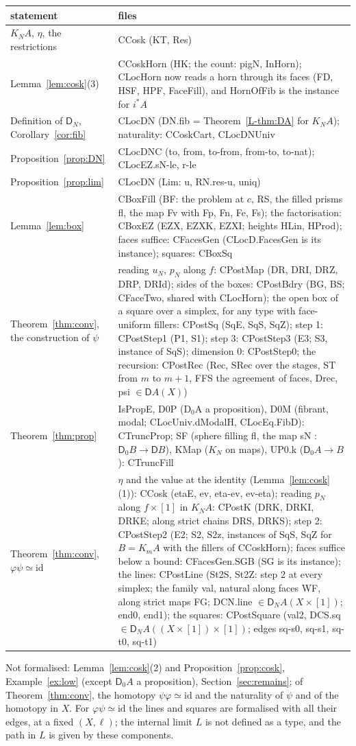 \documentclass[11pt]{article}
\newcommand{\id}{\mathrm{id}}
\newcommand{\D}{\mathsf{D}}
\theoremstyle{plain}
\theoremstyle{definition}
\theoremstyle{remark}
\begin{document}
\medskip
\begin{tabular}{p{4.3cm}p{9.6cm}}
statement & files\\\hline
$K_NA$, $\eta$, the restrictions & CCosk (KT, Res)\\
Lemma~\ref{lem:cosk}(3) & CCoskHorn (HK; the count: pigN, InHorn); CLocHorn now reads a horn through its faces (FD, HSF, HPF, FaceFill), and HornOfFib is the instance for $i^*A$\\
Definition of $\D_N$, Corollary~\ref{cor:fib} & CLocDN (DN.fib = Theorem~\ref{L-thm:DA} for $K_NA$); naturality: CCoskCart, CLocDNUniv\\
Proposition~\ref{prop:DN} & CLocDNC (to, from, to-from, from-to, to-nat); CLocEZ.sN-le, r-le\\
Proposition~\ref{prop:lim} & CLocDN (Lim: u, RN.res-u, uniq)\\
Lemma~\ref{lem:box} & CBoxFill (BF: the problem at $c$, RS, the filled prisms fl, the map Fv with Fp, Fn, Fe, Fs); the factorisation: CBoxEZ (EZX, EZXK, EZXI; heights HLin, HProd); faces suffice: CFacesGen (CLocD.FacesGen is its instance); squares: CBoxSq\\
Theorem~\ref{thm:conv}, the construction of $\psi$ & reading $u_N$, $p_N$ along $f$: CPostMap (DR, DRI, DRZ, DRP, DRId); sides of the boxes: CPostBdry (BG, BS; CFaceTwo, shared with CLocHorn); the open box of a square over a simplex, for any type with face-uniform fillers: CPostSq (SqE, SqS, SqZ); step 1: CPostStep1 (P1, S1); step 3: CPostStep3 (E3; S3, instance of SqS); dimension 0: CPostStep0; the recursion: CPostRec (Rec, SRec over the stages, ST from $m$ to $m+1$, FFS the agreement of faces, Drec, psi $\in\D A(X)$)\\
Theorem~\ref{thm:prop} & IsPropE, D0P (D$_0$A a proposition), D0M (fibrant, modal; CLocUniv.dModalH, CLocEq.FibD): CTruncProp; SF (sphere filling fl, the map sN : $\D_0B\to\D B$), KMap ($K_N$ on maps), UP0.k ($\D_0A\to B$): CTruncFill\\
Theorem~\ref{thm:conv}, $\varphi\psi\simeq\id$ & $\eta$ and the value at the identity (Lemma~\ref{lem:cosk}(1)): CCosk (etaE, ev, eta-ev, ev-eta); reading $p_N$ along $f\times[1]$ in $K_NA$: CPostK (DRK, DRKI, DRKE; along strict chains DRS, DRKS); step 2: CPostStep2 (E2; S2, S2z, instances of SqS, SqZ for $B=K_mA$ with the fillers of CCoskHorn); faces suffice below a bound: CFacesGen.SGB (SG is its instance); the lines: CPostLine (St2S, St2Z: step 2 at every simplex; the family val, natural along faces WF, along strict maps FG; DCN.line $\in\D_NA(X\times[1])$; end0, end1); the squares: CPostSquare (val2, DCS.sq $\in\D_NA((X\times[1])\times[1])$; edges sq-s0, sq-s1, sq-t0, sq-t1)
\end{tabular}

\medskip
Not formalised: Lemma~\ref{lem:cosk}(2) and Proposition~\ref{prop:cosk},
Example~\ref{ex:low} (except $\D_0A$ a proposition), Section~\ref{sec:remains}; of Theorem~\ref{thm:conv},
the homotopy $\psi\varphi\simeq\id$ and the naturality of $\psi$ and of the
homotopy in $X$. For $\varphi\psi\simeq\id$ the lines and squares are
formalised with all their edges, at a fixed $(X,\ell)$; the internal limit $L$
is not defined as a type, and the path in $L$ is given by these components.
\end{document}
